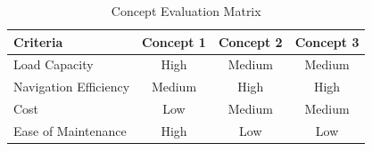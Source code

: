 \documentclass[12pt,titlepage]{article}
\begin{document}
\vspace{-10pt}
\begin{table}[h!]
\centering
\caption{Concept Evaluation Matrix}
\begin{tabular}{@{}lccc@{}}
\toprule
\textbf{Criteria}      & \textbf{Concept 1} & \textbf{Concept 2} &\textbf{Concept 3} \\ \midrule
Load Capacity          & High               & Medium              & Medium            \\
Navigation Efficiency  & Medium             & High                & High              \\
Cost                   & Low                & Medium              & Medium            \\
Ease of Maintenance    & High               & Low                 & Low               \\ \bottomrule
\end{tabular}
\label{tab:concept_evaluation}
\end{table}
\FloatBarrier


\vspace{-25pt}
\end{document}
